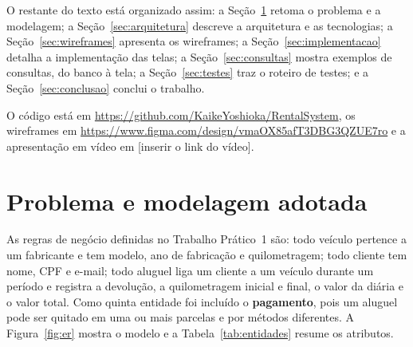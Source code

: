 \documentclass[12pt]{article}
\begin{document}
O restante do texto está organizado assim: a Seção~\ref{sec:modelagem} retoma o problema e a
modelagem; a Seção~\ref{sec:arquitetura} descreve a arquitetura e as tecnologias; a
Seção~\ref{sec:wireframes} apresenta os wireframes; a Seção~\ref{sec:implementacao} detalha a
implementação das telas; a Seção~\ref{sec:consultas} mostra exemplos de consultas, do banco à tela;
a Seção~\ref{sec:testes} traz o roteiro de testes; e a Seção~\ref{sec:conclusao} conclui o trabalho.

O código está em \url{https://github.com/KaikeYoshioka/RentalSystem}, os wireframes em
\url{https://www.figma.com/design/vmaOX85afT3DBG3QZUE7ro} e a apresentação em vídeo em
[inserir o link do vídeo].

\section{Problema e modelagem adotada}
\label{sec:modelagem}

As regras de negócio definidas no Trabalho Prático~1 são: todo veículo pertence a um fabricante e
tem modelo, ano de fabricação e quilometragem; todo cliente tem nome, CPF e e-mail; todo aluguel
liga um cliente a um veículo durante um período e registra a devolução, a quilometragem inicial e
final, o valor da diária e o valor total. Como quinta entidade foi incluído o \textbf{pagamento},
pois um aluguel pode ser quitado em uma ou mais parcelas e por métodos diferentes.
A Figura~\ref{fig:er} mostra o modelo e a Tabela~\ref{tab:entidades} resume os atributos.
\end{document}
